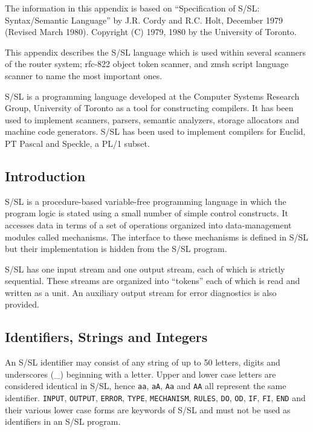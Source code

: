 
The information in this appendix is based on 
``Specification of S/SL: Syntax/Semantic Language'' by 
J.R. Cordy and R.C. Holt, December 1979 (Revised March 1980).
Copyright (C) 1979, 1980 by the  University of  Toronto.

This appendix describes the S/SL language which is used
within several scanners of the router system; rfc-822
object token scanner, and zmsh script language scanner
to name the most important ones.

S/SL is a programming language developed at
the Computer Systems Research Group,
University of Toronto as a tool for constructing compilers.
It has been used to implement scanners, parsers, semantic
analyzers, storage allocators and machine code generators.
S/SL  has  been  used  to implement compilers for Euclid, PT
Pascal and Speckle, a PL/1 subset.


\subsection{Introduction}

S/SL is a procedure-based variable-free programming 
language in which the program logic is  stated  using  a  small
number  of  simple  control constructs.  It accesses data in
terms of a set of operations organized into  data-management
modules  called  mechanisms.   The interface to these 
mechanisms is defined in S/SL but their implementation is  hidden
from the S/SL program.

S/SL has one input stream and one output stream, each of
which is strictly sequential.  These streams  are  organized
into ``tokens'' each of which is read and written as a unit.
An auxiliary output stream for  error  diagnostics  is  also
provided.




\subsection{Identifiers, Strings and Integers}

An  S/SL identifier may consist of any string of up to 50
letters, digits and underscores (\_) beginning with a letter.
Upper  and  lower  case  letters are considered identical in
S/SL, hence {\tt aa}, {\tt aA}, {\tt Aa} and {\tt AA} 
all represent the same identifier.  {\tt INPUT}, {\tt OUTPUT}, 
{\tt ERROR}, {\tt TYPE}, {\tt MECHANISM}, {\tt RULES}, 
{\tt DO}, {\tt OD}, {\tt IF}, {\tt FI}, {\tt END} 
and their various lower case forms are  keywords
of  S/SL and must not be used as identifiers in an S/SL 
program.

